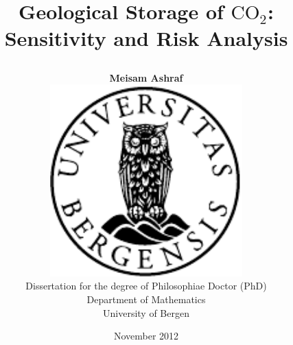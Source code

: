 \documentclass[10pt]{book}
\title{
{\fontsize{28}{30}\usefont{OT1}{phv}{bc}{n}\selectfont
Geological Storage of $\mbox{CO}_2$: \\Sensitivity and Risk Analysis}
	\author{
	\textbf{Meisam Ashraf}\vspace{3cm}\\
		\includegraphics[width=74mm]{figurer/uglo}\vspace{1em}\\
		Dissertation for the degree of Philosophiae Doctor (PhD)\vspace{3.5em}\\
		Department of Mathematics\\
		University of Bergen
	}
	\date{November 2012}
}
\begin{document}

\ifDownscaledFinalDoc
	\fontsize{\TextSize}{\BaseLineSkip}
	\selectfont
\fi

\ifDraft
	\doublespacing
\fi


\maketitle
\frontmatter




\tableofcontents
\listoffigures

\mainmatter

%
%

%
%
\appendix


\backmatter

%
%

%
%
%

%
%



\end{document}
